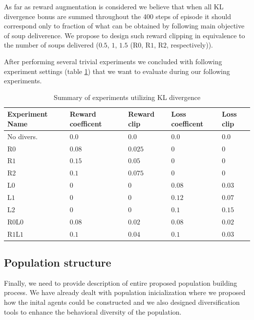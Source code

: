 As far as reward augmentation is considered we believe that when all KL divergence bonus are summed throughout the 400 steps of episode it should correspond only to fraction of what can be obtained by following main objective of soup deliverence.
We propose to design such reward clipping in equivalence to the number of soups delivered ($0.5$, $1$, $1.5$ (R$0$, R$1$, R$2$, respectively)).

After performing several trivial experiments we concluded with following experiment settings (table \ref{tab:KLDiv-coefiicents}) that we want to evaluate during our following experiments.



\begin{table}[htbp]
    \small
    \centering
    \begin{tabular}{lllll}
      \toprule
      Experiment Name        & Reward coefficent     & Reward clip  & Loss coefficent  & Loss clip          \\ \midrule

      No divers.     & $0.0$     & $0.0$   & $0.0$     & $0.0$                        \\\midrule  
      R$0$     & $0.08$     & $0.025$   & $0$     & $0$                        \\
      R$1$     & $0.15$     & $0.05$   & $0$     & $0$                        \\
      R$2$     & $0.1$     & $0.075$   & $0$     & $0$                        \\\midrule
      L$0$     & $0$     & $0$   & $0.08$     & $0.03$                        \\
      L$1$     & $0$     & $0$   & $0.12$     & $0.07$                        \\      
      L$2$     & $0$     & $0$   & $0.1$     & $0.15$                        \\\midrule      
      R$0$L$0$     & $0.08$     & $0.02$   & $0.08$     & $0.02$                        \\
      R$1$L$1$     & $0.1$     & $0.04$   & $0.1$     & $0.03$                        \\
      
     \bottomrule
    \end{tabular}
    \caption{Summary of experiments utilizing KL divergence}
    \label{tab:KLDiv-coefiicents}
\end{table}


\subsection{Population structure}
Finally, we need to provide description of entire proposed population building process.
We have already dealt with population inicialization where we proposed how the inital agents could be constructed and we also designed diversification tools to enhance the behavioral diversity of the population.

